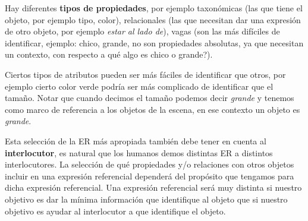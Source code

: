 Hay diferentes \textbf{tipos de propiedades}, por ejemplo taxon\'omicas (las que tiene el objeto, por ejemplo tipo, color), relacionales (las que necesitan dar una expresi\'on de otro objeto, por ejemplo {\it estar al lado de}), vagas (son las m\'as dif\'iciles de identificar, ejemplo: chico, grande, no son propiedades absolutas, ya que necesitan un contexto, con respecto a qu\'e algo es chico o grande?).

Ciertos tipos de atributos pueden ser m\'as f\'aciles de identificar que otros, por ejemplo cierto color verde podr\'{i}a ser m\'as complicado de identificar que el tama\~no. Notar que cuando decimos el tama\~no podemos decir {\it grande} y tenemos como marco de referencia a los objetos de la escena, en ese contexto un objeto es {\it grande}.

%

Esta selecci\'on de la ER m\'as apropiada tambi\'en debe tener en cuenta al \textbf {interlocutor}, es natural que los humanos demos distintas ER a distintos interlocutores.
La selecci\'on de qu\'e propiedades y/o relaciones con otros objetos incluir en una expresi\'on referencial depender\'a del prop\'osito que tengamos para dicha expresi\'on referencial. Una expresi\'on referencial ser\'a muy distinta si nuestro objetivo es dar la m\'inima informaci\'on que identifique al objeto que si nuestro objetivo es ayudar al interlocutor a que identifique el objeto.

